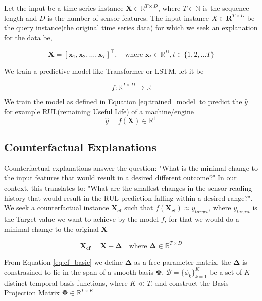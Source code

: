 \documentclass[runningheads]{llncs}
\begin{document}
	Let the input be a time-series instance $\mathbf{X} \in \mathbb{R}^{T \times D}$, where $T \in \mathbb{N}$ is the sequence length and $D$ is the number of sensor features. The input instance $X \in \mathbf{R}^{T \times D}$ be the query instance(the original time series data) for which we seek an explanation for the data be, 
	
	\begin{equation}
		\mathbf{X} = [\mathbf{x}_1, \mathbf{x}_2, \dots, \mathbf{x}_T]^\top, \quad \text{where } \mathbf{x}_t \in \mathbb{R}^{D}, t \in \{1,2,...T\}
	\end{equation}
	
	We train a predictive model like Transformer or LSTM, let it be 
	
	\begin{equation}
		\label{eq:trained_model}
		f: \mathbb{R}^{T \times D} \to \mathbb{R}
	\end{equation}
	
	We train the model as defined in Equation \ref{eq:trained_model} to predict the $\hat{y}$ for example RUL(remaining Useful Life) of a machine/engine  
	\begin{equation}
		\label{eq:RUL}
		\hat{y} = f(\mathbf{X}) \in \mathbb{R}^+
	\end{equation}
	
	\subsection{Counterfactual Explanations}
	Counterfactual explanations answer the question: "What is the minimal change to the input features that would result in a desired different outcome?" In our context, this translates to: "What are the smallest changes in the sensor reading history that would result in the RUL prediction falling within a desired range?". We seek a counterfactual instance $\mathbf{X_{cf}}$ such that $ f(\mathbf{X_{cf}}) \approx y_{target}$, where $y_{target}$ is the Target value we want to achieve by the model $f$, for that we would do a minimal change to the original $\mathbf{X}$ 
	
	\begin{equation}
		\label{eq:cf_basic}
		\mathbf{X_{cf}} = \mathbf{X} + \mathbf{\Delta}
		\quad \text{where } \mathbf{\Delta} \in \mathbb{R}^{T \times D}
	\end{equation}
	
	From Equation \ref{eq:cf_basic} we define $\mathbf{\Delta}$ as a free parameter matrix, the $\mathbf{\Delta}$ is constrasined to lie in the span of a smooth basis $\mathbf{\Phi}$, $\mathcal{B} = \{ \phi_k \}_{k=1}^K$ be a set of $K$ distinct temporal basis functions, where $K \ll T$. and construct the Basis Projection Matrix $\mathbf{\Phi} \in \mathbb{R}^{T \times K}$
	
\end{document}
